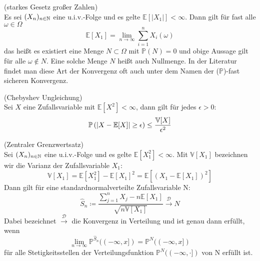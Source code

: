 \begin{Satz}(starkes Gesetz großer Zahlen)\\
	\label{starkesGgZ}
	Es sei $ (X_n)_{n \in \mathbb{N}} $ eine u.i.v.-Folge und es gelte $ \mathbb{E}[|X_1|] < \infty$. Dann gilt für fast alle $ \omega  \in \Omega$ 
	\[
		\mathbb{E}[X_1] = \lim_{n \to \infty} \sum_{i=1}^n X_i(\omega)
	\]
	das heißt es existiert eine Menge $ N \subset \Omega $ mit $ \mathbb{P}(N)=0 $ und obige Aussage gilt für alle $ \omega \not \in N $. Eine solche Menge $ N $ heißt auch Nullmenge. In der Literatur findet man diese Art der Konvergenz oft auch unter dem Namen der ($\mathbb{P}$)-fast sicheren Konvergenz.
\end{Satz} 
\begin{Satz}(Chebyshev Ungleichung)\\
	\label{ChebCheb}
	Sei $ X  $ eine Zufallsvariable mit $ \mathbb{E}[X^2] < \infty $, dann gilt für jedes $ \epsilon > 0 $:
	\[
	\mathbb{P}\left( | X-\mathbb{E}[X] | \geq \epsilon \right) \leq \frac{\mathbb{V}[X]}{\epsilon^2}
	\]
\end{Satz}
\begin{Satz}(Zentraler Grenzwertsatz)\\
	\label{ZGWS}
	Sei $ (X_n)_{n \in \mathbb{N}} $ eine u.i.v.-Folge und es gelte $ \mathbb{E}[X_1^2] < \infty $.
	Mit $ \mathbb{V}[X_1] $ bezeichnen wir die Varianz der Zufallsvariable $ X_1 $:
	\[
		\mathbb{V}[X_1] = \mathbb{E}[X_1^2]-\mathbb{E}[X_1]^2 = \mathbb{E}[(X_1-\mathbb{E}[X_1])^2]
	\]
	Dann gilt für eine standardnormalverteilte Zufallsvariable N:
	\[
		\hat{S}_n \coloneqq\frac{\sum_{j=1}^{n}X_j-n\mathbb{E}[X_1]}{\sqrt{n\mathbb{V}[X_1]}} \stackrel{\mathcal{D}}{\to} N
	\]
	Dabei bezeichnet $ \stackrel{\mathcal{D}}{\to} $ die Konvergenz in Verteilung und ist genau dann erfüllt, wenn 
	\[ \lim\limits_{n \to \infty} \mathbb{P}^{\hat{S}_n}((-\infty,x]) = \mathbb{P}^N((-\infty,x])
	\]
	für alle Stetigkeitsstellen der Verteilungsfunktion $ \mathbb{P}^N((-\infty,\cdot]) $ von N erfüllt ist.
\end{Satz}


